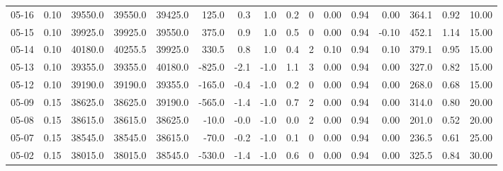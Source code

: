 \begin{threeparttable}
{\begin{tabular}{lrrrrrrrrrrrrrrr}
  05-16 &     0.10 & 39550.0 & 39550.0 & 39425.0 &      125.0 &            0.3 &                      1.0 &                 0.2 &              0 &       0.00 &      0.94 &           0.00 &            364.1 &            0.92 &                  10.00 \\
  05-15 &     0.10 & 39925.0 & 39925.0 & 39550.0 &      375.0 &            0.9 &                      1.0 &                 0.5 &              0 &       0.00 &      0.94 &          -0.10 &            452.1 &            1.14 &                  15.00 \\
  05-14 &     0.10 & 40180.0 & 40255.5 & 39925.0 &      330.5 &            0.8 &                      1.0 &                 0.4 &              2 &       0.10 &      0.94 &           0.10 &            379.1 &            0.95 &                  15.00 \\
  05-13 &     0.10 & 39355.0 & 39355.0 & 40180.0 &     -825.0 &           -2.1 &                     -1.0 &                 1.1 &              3 &       0.00 &      0.94 &           0.00 &            327.0 &            0.82 &                  15.00 \\
  05-12 &     0.10 & 39190.0 & 39190.0 & 39355.0 &     -165.0 &           -0.4 &                     -1.0 &                 0.2 &              0 &       0.00 &      0.94 &           0.00 &            268.0 &            0.68 &                  15.00 \\
  05-09 &     0.15 & 38625.0 & 38625.0 & 39190.0 &     -565.0 &           -1.4 &                     -1.0 &                 0.7 &              2 &       0.00 &      0.94 &           0.00 &            314.0 &            0.80 &                  20.00 \\
  05-08 &     0.15 & 38615.0 & 38615.0 & 38625.0 &      -10.0 &           -0.0 &                     -1.0 &                 0.0 &              2 &       0.00 &      0.94 &           0.00 &            201.0 &            0.52 &                  20.00 \\
  05-07 &     0.15 & 38545.0 & 38545.0 & 38615.0 &      -70.0 &           -0.2 &                     -1.0 &                 0.1 &              0 &       0.00 &      0.94 &           0.00 &            236.5 &            0.61 &                  25.00 \\
  05-02 &     0.15 & 38015.0 & 38015.0 & 38545.0 &     -530.0 &           -1.4 &                     -1.0 &                 0.6 &              0 &       0.00 &      0.94 &           0.00 &            325.5 &            0.84 &                  30.00 \\

\end{tabular}}
\end{threeparttable}
